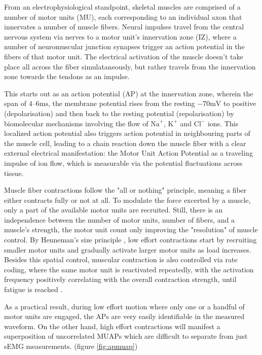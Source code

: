\documentclass{thesis}
\newcommand{\mV}{\unit{\milli\volt}}
\newcommand{\ms}{\unit{\milli\second}}
\begin{document}
From an electrophysiological standpoint, skeletal muscles are comprised of a number of motor units (MU), each corresponding to an individual axon that innervates a number of muscle fibers. Neural impulses travel from the central nervous system via nerves to a motor unit's innervation zone (IZ), where a number of neuromuscular junction synapses trigger an action potential in the fibers of that motor unit. The electrical activation of the muscle doesn't take place all across the fiber simulataneously, but rather travels from the innervation zone towards the tendons as an impulse.

This starts out as an action potential (AP) at the innervation zone, wherein the span of $\numrange{4}{6} \ms$, the membrane potential rises from the resting $-70 \mV$ to positive (depolarisation) and then back to the resting potential (repolarisation) by biomolecular mechanisms involving the flow of $\text{Na}^+$, $\text{K}^+$ and $\text{Cl}^-$ ions. This localized action potential also triggers action potential in neighbouring parts of the muscle cell, leading to a chain reaction down the muscle fiber with a clear external electrical manifestation: the Motor Unit Action Potential as a traveling impulse of ion flow, which is measurable via the potential fluctuations across tissue.

Muscle fiber contractions follow the "all or nothing" principle, meaning a fiber either contracts fully or not at all. To modulate the force excerted by a muscle, only a part of the available motor units are recruited. Still, there is an independence between the number of motor units, number of fibers, and a muscle's strength, the motor unit count only improving the "resolution" of muscle control. By Henneman's size principle \cite{Henneman1957}, low effort contractions start by recruiting smaller motor units and gradually activate larger motor units as load increases. Besides this spatial control, muscular contraction is also controlled via rate coding, where the same motor unit is reactivated repeatedly, with the activation frequency positively correlating with the overall contraction strength, until fatigue is reached \cite{DeLuca1985}.

As a practical result, during low effort motion where only one or a handful of motor units are engaged, the APs are very easily identifiable in the measured waveform. On the other hand, high effort contractions will manifest a superposition of uncorrelated MUAPs which are difficult to separate from just sEMG measurements. (figure \ref{fig:apmuap})
\end{document}

